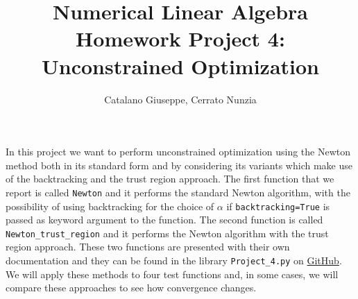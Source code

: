 \documentclass[a4paper,11pt]{article}
\begin{document}
	\author{Catalano Giuseppe, Cerrato Nunzia}
	\title{Numerical Linear Algebra Homework Project 4:\\Unconstrained Optimization}
	\date{}
	\maketitle
	
	\noindent In this project we want to perform unconstrained optimization using the Newton method both in its standard form and by considering its variants which make use of the backtracking and the trust region approach.
	The first function that we report is called \texttt{Newton} and it performs the standard Newton algorithm, with the possibility of using backtracking for the choice of $\alpha$ if \texttt{backtracking=True} is passed as keyword argument to the function. The second function is called \texttt{Newton_trust_region} and it performs the Newton algorithm with the trust region approach. These two functions are presented with their own documentation and they can be found in the library \texttt{Project_4.py} on \href{https://github.com/nunziacerrato/Numerical_Analysis_Optimization/blob/main/Project_4/Project_4.py}{GitHub}.
	We will apply these methods to four test functions and, in some cases, we will compare these approaches to see how convergence changes.
	
\end{document}
